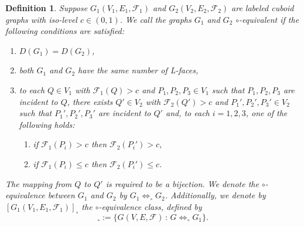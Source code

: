 \documentclass[a4paper,11pt]{article}
\newtheorem{definition}[theorem]{Definition}
\begin{document}
\begin{definition}
Suppose $G_1(V_1,E_1,\mathcal{F}_1)$ and $G_2(V_2,E_2,\mathcal{F}_2)$ are labeled cuboid graphs with
iso-level $c\in (0,1)$. We call the graphs $G_1$ and $G_2$ $\circ$-equivalent if the following conditions
are satisfied:
\begin{enumerate}
\item[(i)] $D(G_1)=D(G_2)$,
\item[(ii)] both $G_1$ and $G_2$ have the same number of L-faces,
\item[(iii)] to each $Q\in V_1$ with $\mathcal{F}_1(Q)>c$ and $P_1,P_2,P_3\in V_1$ such that $P_1, P_2,P_3$ are
incident to $Q$, there exists $Q'\in V_2$ with $\mathcal{F}_2(Q')>c$ and $P_1',P_2',P_3'\in V_2$ such that
$P_1', P_2',P_3'$ are incident to $Q'$ and, to each $i=1,2,3$, one of the following holds:
  \begin{enumerate}
   \item[(a)] if $\mathcal{F}_1(P_i)>c$ then $\mathcal{F}_2(P_i')>c$,
   \item[(b)] if $\mathcal{F}_1(P_i)\leq c$ then $\mathcal{F}_2(P_i')\leq c$.
  \end{enumerate}
\end{enumerate}
The mapping from $Q$ to $Q'$ is required to be a bijection. We denote the $\circ$-equivalence between $G_1$
and $G_2$ by $G_1\Longleftrightarrow_{\circ}G_2$. Additionally, we denote by $[G_1(V_1,E_1,\mathcal{F}_1)]_{\circ}$
the $\circ$-equivalence class, defined by
\begin{equation}
[G_1(V_1,E_1,\mathcal{F}_1)]_{\circ}:=\{G(V,E,\mathcal{F})\,:\,G\Longleftrightarrow_{\circ}G_1\}.
\label{eq:equivalence-1}
\end{equation}
\label{def:equivalence-1}
\end{definition}
\end{document}
